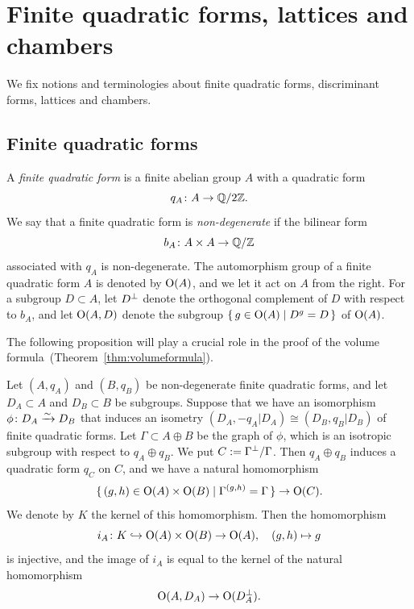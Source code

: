 \documentclass{amsart}
\numberwithin{procedure}{section}
\begin{document}
\section{Finite quadratic forms, lattices and chambers}\label{sec:latandcham}
%
We fix notions and terminologies about finite quadratic forms, 
discriminant forms, lattices and chambers.
%
%
\subsection{Finite quadratic forms}\label{subsec:FQF}
%
A \emph{finite quadratic form} is  a finite abelian group $A$ with a quadratic form
\[
q_A\colon A\to \mathord{\mathbb Q}/2\mathord{\mathbb Z}.
\]
We say that a finite quadratic form is \emph{non-degenerate}
if the  bilinear form 
\[
b_A\colon A\times A\to \mathord{\mathbb Q}/\mathord{\mathbb Z}
\]
associated with $q_A$ 
is non-degenerate.
The automorphism group of a finite quadratic form $A$ is denoted by $\mathord{\mathrm{O}}(A)$,
and we let it act on $A$ from the right.
For a subgroup $D\subset A$,
let $D\sp{\perp}$ denote  the orthogonal complement of $D$ with respect to $b_A$,
and let $\mathord{\mathrm{O}}(A, D)$ denote the subgroup $\{\,{g\in \mathord{\mathrm{O}}(A)}\mid {D^g=D} \,\}$ of $\mathord{\mathrm{O}}(A)$.
%
\par
The following proposition will play a crucial role in the proof of
the volume formula~(Theorem~\ref{thm:volumeformula}).
%
\begin{proposition}\label{prop:03}
Let $(A, q_A)$ and $(B, q_B)$ be non-degenerate finite quadratic forms, and 
let $D_A\subset A$ and $D_B\subset B$ be subgroups.
Suppose that we have an isomorphism $\phi\colon D_A\xrightarrow{\sim} D_B$ 
that induces an 
isometry $(D_A, -q_A|D_A)\cong (D_B, q_B|D_B)$
of finite quadratic forms.
Let $\Gamma\subset A\oplus B$ be the graph of $\phi$,
which is an isotropic subgroup with respect to $q_A\oplus q_B$.
We put $C:=\Gamma\sp{\perp}/\Gamma$.
Then $q_A\oplus q_B$ induces a quadratic form $q_C$ on $C$, and 
we have a natural homomorphism
%
\begin{equation*}
\{\,{(g, h) \in \mathord{\mathrm{O}}(A)\times \mathord{\mathrm{O}}(B)}\mid {\Gamma^{(g, h)}=\Gamma} \,\}\to \mathord{\mathrm{O}}(C).
\end{equation*}
%
We denote by $K$ the kernel of this homomorphism.
Then the homomorphism 
\[
i_A\colon K\hookrightarrow \mathord{\mathrm{O}}(A)\times \mathord{\mathrm{O}}(B)  \to  \mathord{\mathrm{O}}(A), \quad (g, h)\mapsto g
\]
is injective, 
and the image of $i_A$ is equal to the kernel 
of the natural homomorphism 
\[
\mathord{\mathrm{O}}(A, D_A)\to \mathord{\mathrm{O}}(D_A\sp{\perp}).
\]
%
\end{proposition}
%
\end{document}
